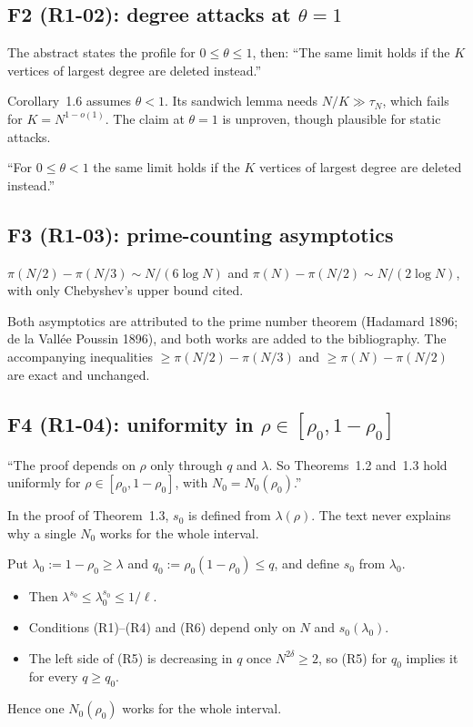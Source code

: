 \documentclass[10pt]{article}
\begin{document}
\subsection*{F2 (R1-02): degree attacks at $\theta=1$}
\begin{before}
The abstract states the profile for $0\le\theta\le1$, then: ``The same limit holds if the $K$ vertices of largest degree are deleted instead.''
\end{before}
\begin{whywrong}
Corollary~1.6 assumes $\theta<1$. Its sandwich lemma needs $N/K\gg\tau_N$, which fails for $K=N^{1-o(1)}$. The claim at $\theta=1$ is unproven, though plausible for static attacks.
\end{whywrong}
\begin{after}
``For $0\le\theta<1$ the same limit holds if the $K$ vertices of largest degree are deleted instead.''
\end{after}

\subsection*{F3 (R1-03): prime-counting asymptotics}
\begin{before}
$\pi(N/2)-\pi(N/3)\sim N/(6\log N)$ and $\pi(N)-\pi(N/2)\sim N/(2\log N)$, with only Chebyshev's upper bound cited.
\end{before}
\begin{after}
Both asymptotics are attributed to the prime number theorem (Hadamard 1896; de la Vall\'ee Poussin 1896), and both works are added to the bibliography. The accompanying inequalities $\ge\pi(N/2)-\pi(N/3)$ and $\ge\pi(N)-\pi(N/2)$ are exact and unchanged.
\end{after}

\subsection*{F4 (R1-04): uniformity in $\rho\in[\rho_0,1-\rho_0]$}
\begin{before}
``The proof depends on $\rho$ only through $q$ and $\lambda$. So Theorems~1.2 and~1.3 hold uniformly for $\rho\in[\rho_0,1-\rho_0]$, with $N_0=N_0(\rho_0)$.''
\end{before}
\begin{whywrong}
In the proof of Theorem~1.3, $s_0$ is defined from $\lambda(\rho)$. The text never explains why a single $N_0$ works for the whole interval.
\end{whywrong}
\begin{after}
Put $\lambda_0:=1-\rho_0\ge\lambda$ and $q_0:=\rho_0(1-\rho_0)\le q$, and define $s_0$ from $\lambda_0$.
\begin{itemize}\itemsep0pt
\item Then $\lambda^{s_0}\le\lambda_0^{s_0}\le1/\ell$.
\item Conditions (R1)--(R4) and (R6) depend only on $N$ and $s_0(\lambda_0)$.
\item The left side of (R5) is decreasing in $q$ once $N^{2\delta}\ge2$, so (R5) for $q_0$ implies it for every $q\ge q_0$.
\end{itemize}
Hence one $N_0(\rho_0)$ works for the whole interval.
\end{after}
\end{document}
